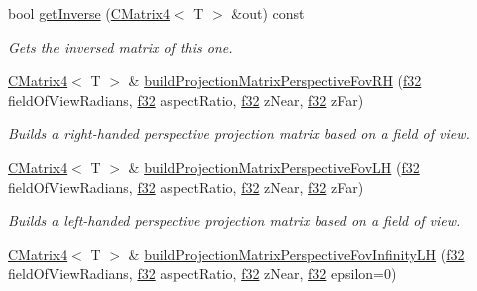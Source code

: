 \begin{DoxyCompactItemize}
bool \hyperlink{classirr_1_1core_1_1CMatrix4_a323bfa0e327636c9cd4a5d2b781b3a60}{get\+Inverse} (\hyperlink{classirr_1_1core_1_1CMatrix4}{C\+Matrix4}$<$ T $>$ \&out) const
\begin{DoxyCompactList}\small\item\em Gets the inversed matrix of this one. \end{DoxyCompactList}\item 
\mbox{\label{classirr_1_1core_1_1CMatrix4_ab16b1c00864aaa6d50059554a7cf344d}} 
\hyperlink{classirr_1_1core_1_1CMatrix4}{C\+Matrix4}$<$ T $>$ \& \hyperlink{classirr_1_1core_1_1CMatrix4_ab16b1c00864aaa6d50059554a7cf344d}{build\+Projection\+Matrix\+Perspective\+Fov\+RH} (\hyperlink{namespaceirr_a0277be98d67dc26ff93b1a6a1d086b07}{f32} field\+Of\+View\+Radians, \hyperlink{namespaceirr_a0277be98d67dc26ff93b1a6a1d086b07}{f32} aspect\+Ratio, \hyperlink{namespaceirr_a0277be98d67dc26ff93b1a6a1d086b07}{f32} z\+Near, \hyperlink{namespaceirr_a0277be98d67dc26ff93b1a6a1d086b07}{f32} z\+Far)
\begin{DoxyCompactList}\small\item\em Builds a right-\/handed perspective projection matrix based on a field of view. \end{DoxyCompactList}\item 
\mbox{\label{classirr_1_1core_1_1CMatrix4_afc198f5cb90f7a8e339c197d7dc365b4}} 
\hyperlink{classirr_1_1core_1_1CMatrix4}{C\+Matrix4}$<$ T $>$ \& \hyperlink{classirr_1_1core_1_1CMatrix4_afc198f5cb90f7a8e339c197d7dc365b4}{build\+Projection\+Matrix\+Perspective\+Fov\+LH} (\hyperlink{namespaceirr_a0277be98d67dc26ff93b1a6a1d086b07}{f32} field\+Of\+View\+Radians, \hyperlink{namespaceirr_a0277be98d67dc26ff93b1a6a1d086b07}{f32} aspect\+Ratio, \hyperlink{namespaceirr_a0277be98d67dc26ff93b1a6a1d086b07}{f32} z\+Near, \hyperlink{namespaceirr_a0277be98d67dc26ff93b1a6a1d086b07}{f32} z\+Far)
\begin{DoxyCompactList}\small\item\em Builds a left-\/handed perspective projection matrix based on a field of view. \end{DoxyCompactList}\item 
\mbox{\label{classirr_1_1core_1_1CMatrix4_a235d52acde7cf2dcfe8d6e61fc840fd1}} 
\hyperlink{classirr_1_1core_1_1CMatrix4}{C\+Matrix4}$<$ T $>$ \& \hyperlink{classirr_1_1core_1_1CMatrix4_a235d52acde7cf2dcfe8d6e61fc840fd1}{build\+Projection\+Matrix\+Perspective\+Fov\+Infinity\+LH} (\hyperlink{namespaceirr_a0277be98d67dc26ff93b1a6a1d086b07}{f32} field\+Of\+View\+Radians, \hyperlink{namespaceirr_a0277be98d67dc26ff93b1a6a1d086b07}{f32} aspect\+Ratio, \hyperlink{namespaceirr_a0277be98d67dc26ff93b1a6a1d086b07}{f32} z\+Near, \hyperlink{namespaceirr_a0277be98d67dc26ff93b1a6a1d086b07}{f32} epsilon=0)

\end{DoxyCompactItemize}

